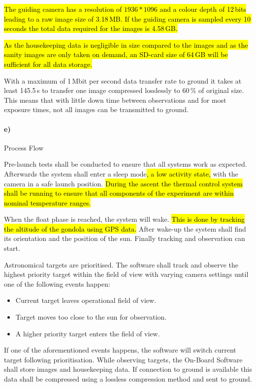 \hl{The guiding camera has a resolution of $1936 * 1096$ and a colour depth of 12\,bits leading to a raw image size of 3.18\,MB. If the guiding camera is sampled every 10\,seconds the total data required for the images is 4.58\,GB.}

\hl{As the housekeeping data is negligible in size compared to the images and as the sanity images are only taken on demand, an SD-card size of 64\,GB will be sufficient for all data storage.}

With a maximum of 1\,Mbit per second data transfer rate to ground it takes at least 145.5\,s to transfer one image compressed losslessly to 60\,\% of original size. This means that with little down time between observations and for most exposure times, not all images can be transmitted to ground.

\paragraph{e)} Process Flow

Pre-launch tests shall be conducted to ensure that all systems work as expected. Afterwards the system shall enter a sleep mode\hl{, a low activity state,} with the camera in a safe launch position. \hl{During the ascent the thermal control system shall be running to ensure that all components of the experiment are within nominal temperature ranges.}

When the float phase is reached, the system will wake. \hl{This is done by tracking the altitude of the gondola using GPS data.} After wake-up the system shall find its orientation and the position of the sun. Finally tracking and observation can start.

Astronomical targets are prioritised. The software shall track and observe the highest priority target within the field of view with varying camera settings until one of the following events happen:

\begin{itemize}
	\item Current target leaves operational field of view.
	\item Target moves too close to the sun for observation.
	\item A higher priority target enters the field of view.
\end{itemize}

If one of the aforementioned events happens, the software will switch current target following prioritisation. While observing targets, the On-Board Software shall store images and housekeeping data. If connection to ground is available this data shall be compressed using a lossless compression method and sent to ground.

